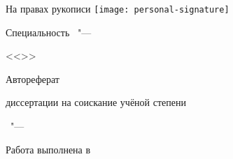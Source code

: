 \thispagestyle{empty}

\vspace{0pt plus1fill} %
\begin{flushright}
  \large{На правах рукописи}
  \texttt{[image: personal-signature]} 
\end{flushright}

\vspace{0pt plus3fill} %
\begin{center}
\textbf {\large \thesisAuthor}
\end{center}

\vspace{0pt plus3fill} %
\begin{center}
\textbf {\Large \thesisTitle}

\vspace{0pt plus3fill} %
{\large Специальность \thesisSpecialtyNumber\ "---\par <<\thesisSpecialtyTitle>>}\par

\vspace{0pt plus1.5fill} %
\Large{Автореферат}\par
\large{диссертации на соискание учёной степени\par \thesisDegree}
\end{center}

\vspace{0pt plus4fill} %
\begin{center}
{\large{\thesisCity\ "--- \thesisYear}}
\end{center}

\newpage
\thispagestyle{empty}
\noindent Работа выполнена в \thesisInOrganization

